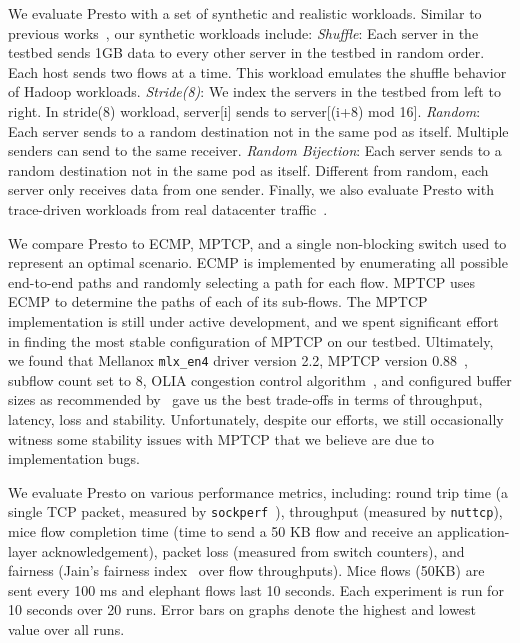We evaluate Presto with a set of synthetic and realistic workloads. 
Similar to previous works~\cite{fattree,hedera,planck}, our synthetic workloads include:
{\em Shuffle}: Each server in the testbed sends 1GB data to every other server in the testbed in random order. 
Each host sends two flows at a time. %
This workload emulates the shuffle behavior of Hadoop workloads.
{\em Stride(8)}: We index the servers in the testbed from left to right. In stride(8) workload, server[i] sends to server[(i+8) mod 16].
{\em Random}: Each server sends to a random destination 
 not in the same pod as itself. Multiple senders can send to the same receiver.
{\em Random Bijection}: Each server sends to a random destination not in the same pod as itself. 
Different from random, each server only receives data from one sender.
Finally, we also evaluate Presto with trace-driven workloads from real datacenter traffic~\cite{kandula2009nature}.

We compare Presto to ECMP, MPTCP, and a 
single non-blocking switch used to represent an optimal scenario.
ECMP is implemented by enumerating all possible end-to-end paths and randomly selecting a path for each flow.
MPTCP uses ECMP to determine the paths of each of its sub-flows.
The MPTCP implementation is still under active development, and
we spent significant effort in finding the most stable configuration of MPTCP on our testbed. Ultimately, we found that Mellanox {\tt mlx\_en4} driver version
2.2, MPTCP version 0.88~\cite{mptcp-linux}, subflow count set to 8, OLIA congestion control algorithm~\cite{mptcp-not-optimal}, and configured buffer sizes
as recommended by~\cite{dc-mptcp,mptcp-not-optimal,paasch2013benefits} gave us the best trade-offs in terms of throughput, latency, loss and stability.
Unfortunately, despite our efforts, we still occasionally witness some stability issues 
with MPTCP that we believe are due to implementation bugs.

We evaluate Presto on various performance metrics, including: 
round trip time (a single TCP packet, measured by {\tt sockperf}~\cite{sockperf}), 
throughput (measured by {\tt nuttcp}),
mice flow completion time (time to send a 50 KB flow and receive an application-layer acknowledgement), packet loss (measured from switch counters), 
and fairness (Jain's fairness index~\cite{jain-fair} over flow throughputs).  Mice flows (50KB) are sent every 100 ms and elephant flows last 10 seconds. 
Each experiment is run for 10 seconds over 20 runs. Error bars on graphs denote
the highest and lowest value over all runs.

